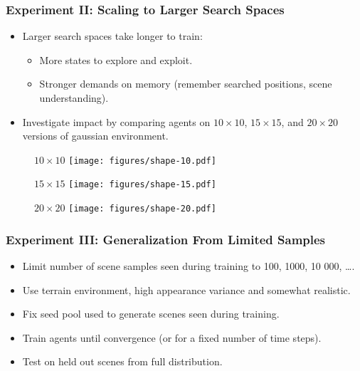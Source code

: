 \begin{frame}
    \frametitle{Experiment II: Scaling to Larger Search Spaces}

    \begin{itemize}
        \item Larger search spaces take longer to train:
        \begin{itemize}
            \item More states to explore and exploit.
            \item Stronger demands on memory (remember searched positions, scene understanding).
        \end{itemize}
        \item Investigate impact by comparing agents on \(10 \times 10\), \(15 \times 15\), and \(20 \times 20\) versions of gaussian environment.
    \end{itemize}
\end{frame}

\begin{frame}
    \begin{figure}
        \centering
        \(10 \times 10\)
        \texttt{[image: figures/shape-10.pdf]}
    \end{figure}
\end{frame}

\begin{frame}
    \begin{figure}
        \centering
        \(15 \times 15\)
        \texttt{[image: figures/shape-15.pdf]}
    \end{figure}
\end{frame}

\begin{frame}
    \begin{figure}
        \centering
        \(20 \times 20\)
        \texttt{[image: figures/shape-20.pdf]}
    \end{figure}
\end{frame}

\begin{frame}
    \frametitle{Experiment III: Generalization From Limited Samples}

    \begin{itemize}
        \item Limit number of scene samples seen during training to 100, 1000, 10 000, \dots.
        \item Use terrain environment, high appearance variance and somewhat realistic.
        \item Fix seed pool used to generate scenes seen during training.
        \item Train agents until convergence (or for a fixed number of time steps).
        \item Test on held out scenes from full distribution. 
    \end{itemize}
\end{frame}

